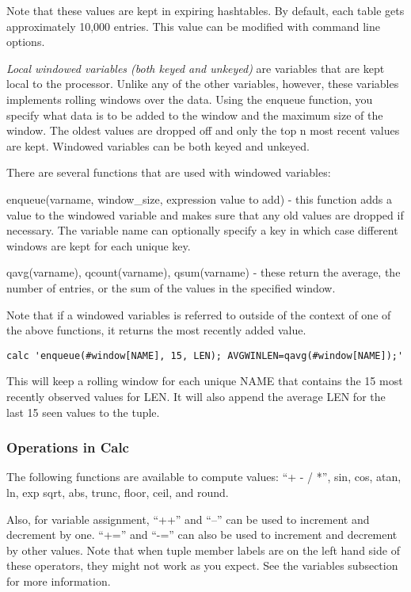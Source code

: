 \documentclass[11pt]{article}
\begin{document}
Note that these values are kept in expiring hashtables.  By default, each table gets approximately
10,000 entries.  This value can be modified with command line options.

\emph{Local windowed variables (both keyed and unkeyed)} are variables that are kept local to the
processor.  Unlike any of the other variables, however, these variables implements rolling windows
over the data.  Using the enqueue function, you specify what data is to be added to the window and
the maximum size of the window.  The oldest values are dropped off and only the top n most recent
values are kept.  Windowed variables can be both keyed and unkeyed.

There are several functions that are used with windowed variables:

enqueue(varname, window\_size, expression value to add) - this function adds a value to the 
windowed variable and makes sure that any old values are dropped if necessary.  The variable
name can optionally specify a key in which case different windows are kept for each unique key.

qavg(varname), qcount(varname), qsum(varname) - these return the average, the number of entries, or
the sum of the values in the specified window.

Note that if a windowed variables is referred to outside of the context of one of the above functions,
it returns the most recently added value.

\begin{lstlisting}
calc 'enqueue(#window[NAME], 15, LEN); AVGWINLEN=qavg(#window[NAME]);'
\end{lstlisting}

This will keep a rolling window for each unique NAME that contains the 15 most recently observed
values for LEN.  It will also append the average LEN for the last 15 seen values to the tuple.

\subsubsection {Operations in Calc}

The following functions are available to compute values: ``+ - / *'', sin, cos, atan, ln, exp
sqrt, abs, trunc, floor, ceil, and round.

Also, for variable assignment, ``++'' and ``--'' can be used to increment and decrement by one.
``+='' and ``-='' can also be used to increment and decrement  by other values.  Note that
when tuple member labels are on the left hand side of these operators, they might not work 
as you expect.  See the variables subsection for more information.
\end{document}
